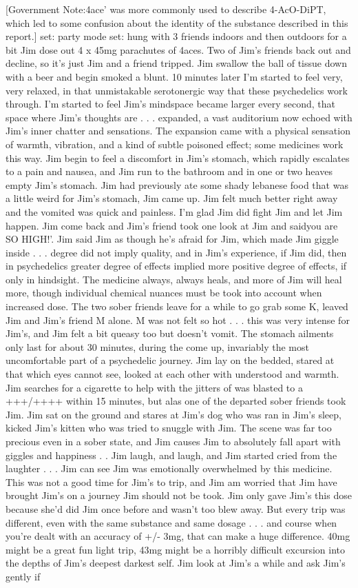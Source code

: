 \documentclass[12pt]{book}
\begin{document}
[Government Note:4ace' was more commonly used to describe 4-AcO-DiPT, which led to some confusion about the identity of the substance described in this report.] set: party mode set: hung with 3 friends indoors and then outdoors for a bit Jim dose out 4 x 45mg parachutes of 4aces. Two of Jim's friends back out and decline, so it's just Jim and a friend tripped. Jim swallow the ball of tissue down with a beer and begin smoked a blunt. 10 minutes later I'm started to feel very, very relaxed, in that unmistakable serotonergic way that these psychedelics work through. I'm started to feel Jim's mindspace became larger every second, that space where Jim's thoughts are . . . expanded, a vast auditorium now echoed with Jim's inner chatter and sensations. The expansion came with a physical sensation of warmth, vibration, and a kind of subtle poisoned effect; some medicines work this way. Jim begin to feel a discomfort in Jim's stomach, which rapidly escalates to a pain and nausea, and Jim run to the bathroom and in one or two heaves empty Jim's stomach. Jim had previously ate some shady lebanese food that was a little weird for Jim's stomach, Jim came up. Jim felt much better right away and the vomited was quick and painless. I'm glad Jim did fight Jim and let Jim happen. Jim come back and Jim's friend took one look at Jim and saidyou are SO HIGH!'. Jim said Jim as though he's afraid for Jim, which made Jim giggle inside . . . degree did not imply quality, and in Jim's experience, if Jim did, then in psychedelics greater degree of effects implied more positive degree of effects, if only in hindsight. The medicine always, always heals, and more of Jim will heal more, though individual chemical nuances must be took into account when increased dose. The two sober friends leave for a while to go grab some K, leaved Jim and Jim's friend M alone. M was not felt so hot . . . this was very intense for Jim's, and Jim felt a bit queasy too but doesn't vomit. The stomach ailments only last for about 30 minutes, during the come up, invariably the most uncomfortable part of a psychedelic journey. Jim lay on the bedded, stared at that which eyes cannot see, looked at each other with understood and warmth. Jim searches for a cigarette to help with the jitters of was blasted to a +++/++++ within 15 minutes, but alas one of the departed sober friends took Jim. Jim sat on the ground and stares at Jim's dog who was ran in Jim's sleep, kicked Jim's kitten who was tried to snuggle with Jim. The scene was far too precious even in a sober state, and Jim causes Jim to absolutely fall apart with giggles and happiness . . Jim laugh, and laugh, and Jim started cried from the laughter . . . Jim can see Jim was emotionally overwhelmed by this medicine. This was not a good time for Jim's to trip, and Jim am worried that Jim have brought Jim's on a journey Jim should not be took. Jim only gave Jim's this dose because she'd did Jim once before and wasn't too blew away. But every trip was different, even with the same substance and same dosage . . . and course when you're dealt with an accuracy of +/- 3mg, that can make a huge difference. 40mg might be a great fun light trip, 43mg might be a horribly difficult excursion into the depths of Jim's deepest darkest self. Jim look at Jim's a while and ask Jim's gently if 
\end{document}
